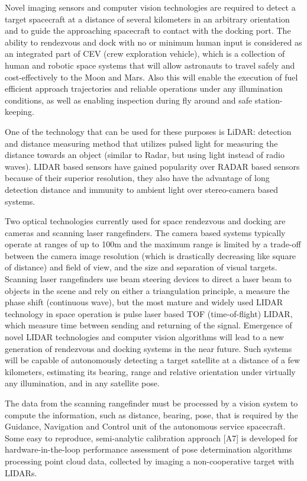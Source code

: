 Novel imaging sensors and computer vision technologies are required to detect a target spacecraft at a distance of several kilometers in an arbitrary orientation and to guide the approaching spacecraft to contact with the docking port. 
The ability to rendezvous and dock with no or minimum human input is considered as an integrated part of CEV (crew exploration vehicle),
which is a collection of human and robotic space systems that will allow astronauts to travel safely and cost-effectively to the Moon and Mars.
Also  this will enable the execution of fuel efficient approach trajectories and reliable operations under any illumination conditions,
as well as enabling inspection during fly around and safe station-keeping.

One of the technology that can be used for these purposes is LiDAR: detection and distance measuring method that utilizes pulsed light for measuring the distance towards an object (similar to Radar, but using light instead of radio waves).
LIDAR based sensors have gained popularity over RADAR based sensors because of their superior resolution, they also
have the advantage of long detection distance and immunity to ambient light over stereo-camera based systems.

Two optical technologies currently used for space rendezvous and docking are cameras and scanning laser rangefinders.
The camera based systems typically operate at ranges of up to 100m and the maximum range is limited by a trade-off between
the camera image resolution (which is drastically decreasing like square of distance) and field of view, and the size and separation of visual targets.
Scanning laser rangefinders use beam steering devices to direct a laser beam to objects in the scene and rely on either a triangulation principle,
a measure the phase shift (continuous wave), but the most mature and widely used LIDAR technology in space operation is pulse laser based TOF (time-of-flight) LIDAR,
which measure time between sending and returning of the signal.
Emergence of novel LIDAR technologies and computer vision algorithms will lead to a new generation of rendezvous and docking systems in the near future.
Such systems will be capable of autonomously detecting a target satellite at a distance of a few kilometers, estimating its bearing, range and relative orientation under virtually any illumination, and in any satellite pose.

The data from the scanning rangefinder must be processed by a vision system to compute the information, such as
distance, bearing, pose, that is required by the Guidance, Navigation and Control unit of the autonomous service
spacecraft. Some easy to reproduce, semi-analytic calibration approach [A7] is developed
for hardware-in-the-loop performance assessment of pose determination algorithms processing point
cloud data, collected by imaging a non-cooperative target with LIDARs. 


